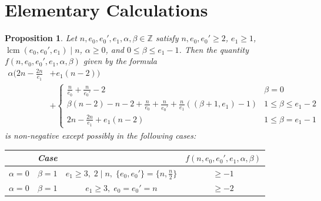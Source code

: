 \documentclass[12pt]{amsart}
\numberwithin{equation}{section}
\newtheorem{prop}[equation]{Proposition}
\theoremstyle{definition}
\newcommand{\Z}{\mathbb Z}
\DeclareMathOperator{\lcm}{lcm}
\begin{document}
\appendix

\section{Elementary Calculations}\label{appendix}

\begin{prop}\label{prop: proof of positivity for type II}
    Let $n,e_0,e_0',e_1,\alpha,\beta\in\Z$ satisfy $n,e_0,e_0'\geq 2$, $e_1\geq 1$, $\lcm(e_0,e_0',e_1)\mid n$, $\alpha\geq 0$, and $0\leq \beta\leq e_1-1$. Then the quantity $f(n,e_0,e_0',e_1,\alpha,\beta)$ given by the formula
    \begin{align*}
        \alpha(2n-\frac{2n}{e_1}&+e_1(n-2))\\
        &+ \begin{cases}
        \frac{n}{e_0}+\frac{n}{e_0'}-2&\beta=0\\
        \beta(n-2)-n-2+\frac{n}{e_0}+\frac{n}{e_0'}+\frac{n}{e_1}((\beta+1,e_1)-1)&1\leq \beta\leq e_1-2\\
        2n-\frac{2n}{e_1}+e_1(n-2)&1\leq\beta=e_1-1
        \end{cases}
    \end{align*}
    is non-negative except possibly in the following cases:
    \begin{table}[h!]
    \centering
    \renewcommand{\arraystretch}{1.4}
    \begin{tabular}{|ccc|c|}
        \hline
        & \textbf{\textup{Case}} &  & $f(n,e_0,e_0',e_1,\alpha,\beta)$ \\
        \hline
        $\alpha=0$ & $\beta=1$ & $e_1\geq 3,\; 2\mid n,\; \{e_0,e_0'\}=\{n,\frac{n}{2}\}$ & $\geq-1$ \\
        \hline
        $\alpha=0$ & $\beta=1$ & $e_1\geq 3,\; e_0=e_0'=n$ & $\geq-2$ \\
        \hline
    \end{tabular}
    \end{table}
\end{prop}
\end{document}
